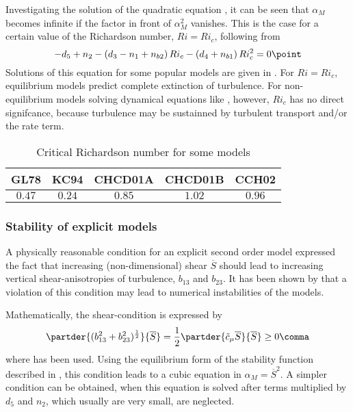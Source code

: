 Investigating the solution of the quadratic equation , it
can be seen that $\alpha_M$ becomes infinite if the factor in front of
$\alpha_M^2$ vanishes. This is the case for a certain value of the
Richardson number, $Ri=Ri_c$, following from 
\begin{equation}
 \label{Ric}
    -d_5 + n_2 - \left( d_3 - n_1 + n_{b2}\right) Ri_c 
               - \left( d_4 + n_{b1}      \right) Ri_c^2  = 0
  \point
\end{equation}
Solutions of this equation for some popular models are given in
. For $Ri=Ri_c$, equilibrium models predict complete extinction of
turbulence. For non-equilibrium models solving dynamical equations
like , however, $Ri_c$ has no direct signifcance, because
turbulence may be sustainned by turbulent transport and/or the rate
term.
\begin{table}[!h]
 \begin{center}
  \begin{tabular}{ccccc}                                                   
    GL78    &  KC94   &  CHCD01A  & CHCD01B  &  CCH02   \\ \hline
    $0.47$  &  $0.24$ &  $0.85$   & $1.02$   &  $0.96$      
   \end{tabular}
  \end{center}
 \caption{\label{tab:Ric}Critical Richardson number for some models}
\end{table}

\subsubsection{Stability of explicit models}
A physically reasonable condition for an explicit second order model
expressed the fact that increasing (non-dimensional) shear
$\overline{S}$ should lead to increasing vertical shear-anisotropies
of turbulence, $b_{13}$ and $b_{23}$. It has been shown by
\cite{BurchardDeleersnijder2001} that a violation of this condition
may lead to numerical instabilities of the models.

Mathematically, the shear-condition is expressed by
\begin{equation}
  \label{shearCondition}
  \partder{(b_{13}^2 + b_{23}^2)^\frac{1}{2}}{\overline{S}} 
   = \dfrac{1}{2} \partder{\tilde{c}_\mu \overline{S}}{\overline{S}}\ge 0
  \comma
\end{equation}
where  has been used. Using the equilibrium form of the stability
function described in , this condition leads to a
cubic equation in $\alpha_M=\overline{S}^2$. A simpler condition can
be obtained, when this equation is solved after terms multiplied by
$d_5$ and $n_2$, which usually are very small, are neglected.

